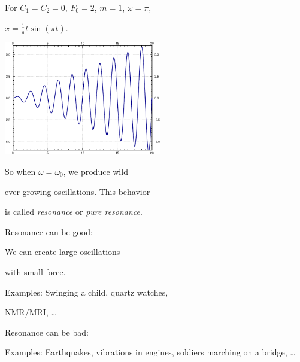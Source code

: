 \documentclass[10pt,aspectratio=169]{beamer}
\begin{document}
\begin{frame}
For $C_1=C_2=0$, $F_0 = 2$,
$m=1$, $\omega = \pi$,

\medskip

\quad $x = \frac{1}{\pi} t \sin (\pi t)$.

\vspace*{-0.4in}

\hfill\includegraphics[width=2.7in]{../figures/3-6-resonance.pdf}

\vspace*{-1.55in}

\pause

So when $\omega = \omega_0$, we produce wild

ever growing oscillations.
This behavior

is called \emph{resonance} or
\emph{pure resonance}.

\medskip
\pause

Resonance can be good:

We can create large oscillations

with small force.

\pause

Examples: Swinging a child, quartz watches,

NMR/MRI, \ldots

\medskip
\pause

Resonance can be bad:

Examples: Earthquakes, vibrations in engines, soldiers marching on a bridge,
\ldots

\end{frame}
\end{document}
